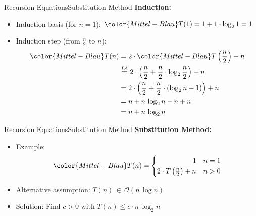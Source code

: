 
\begin{frame}{Recursion Equations}{Substitution Method}
  \textbf{Induction:}
  \begin{itemize}
    \item
      Induction basis (for {\color{Mittel-Blau}$n = 1$}):
      ${\color{Mittel-Blau}T(1)} = 1 + 1 \cdot \log_2 1 = 1$
    \item
      Induction step (from {\color{Mittel-Blau}$\frac{n}{2}$}
      to {\color{Mittel-Blau}$n$}):
      \begin{align*}
        {\color{Mittel-Blau}T(n)} & =
          2 \cdot {\color{Mittel-Blau}T\left(\dfrac{n}{2}\right)} + n\\
          {} & \stackrel{IA}{=} 2 \cdot \left(
            \dfrac{n}{2} + \dfrac{n}{2} \cdot \log_2 \dfrac{n}{2}
          \right) + n \\
          {} & = 2 \cdot \left(
            \dfrac{n}{2} + \dfrac{n}{2} \cdot \left(\log_2 n - 1\right)
          \right) + n\\
          {} & = n + n \, \log_2 n - n + n\\
          {} & = n + n \, \log_2 n
      \end{align*}
  \end{itemize}
\end{frame}


\begin{frame}{Recursion Equations}{Substitution Method}
  \textbf{Substitution Method:}
  \begin{itemize}
    \item
      Example:
      \begin{displaymath}
        \color{Mittel-Blau}
        T(n) = \begin{cases}
          \hfill 1 & n = 1\\
          2 \cdot T\left(\frac{n}{2}\right) + n & n > 0
        \end{cases}
      \end{displaymath}
    \item
      Alternative assumption:
      {\color{Mittel-Blau}$T(n) \, \in \, \mathcal{O}(n \, \log n)$}
    \item
      Solution: Find {\color{Mittel-Blau}$c > 0$} with
      {\color{Mittel-Blau}$T(n) \leq c \cdot n \, \log_2 n$}
  \end{itemize}
\end{frame}

